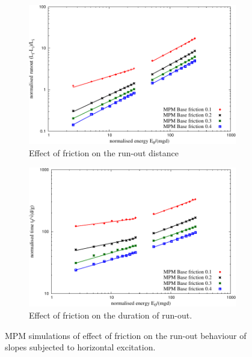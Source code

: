 \documentclass[3p,times,procedia,number]{elsarticle}
\begin{document}
\begin{figure}[tbhp]
  \centering
  \begin{subfigure}[b]{0.49\textwidth}
    \centering
    \includegraphics[width=\textwidth]{figs/runout_fric_slope}
    \caption{Effect of friction on the run-out distance}
    \label{fig:runout_fric_slope}
  \end{subfigure}
  \begin{subfigure}[b]{0.49\textwidth}
    \centering
    \includegraphics[width=\textwidth]{figs/time_fric_slope}
    \caption{Effect of friction on the duration of run-out.}
    \label{fig:time_fric_slope}
  \end{subfigure}
  \caption{MPM simulations of effect of friction on the run-out behaviour of 
  slopes subjected to horizontal excitation.}
  \label{fig:fric_slope}
\end{figure}
\end{document}
